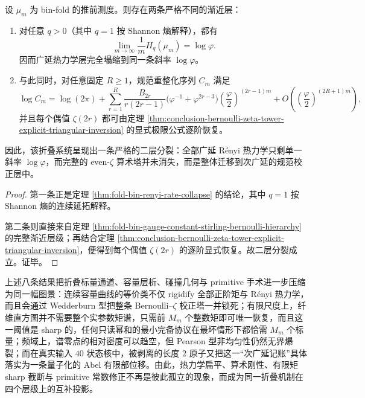 \begin{theorem}[热力学扁平之下的算术刚性]\label{thm:conclusion-thermodynamic-flattening-subextensive-arithmetic-rigidity}
设 \(\mu_m\) 为 bin-fold 的推前测度。则存在两条严格不同的渐近层：
\begin{enumerate}
  \item 对任意 \(q>0\)（其中 \(q=1\) 按 Shannon 熵解释），都有
  \[
  \lim_{m\to\infty}\frac{1}{m}H_q(\mu_m)=\log\varphi.
  \]
  因而广延热力学层完全塌缩到同一条斜率 \(\log\varphi\)。
  \item 与此同时，对任意固定 \(R\ge 1\)，规范重整化序列 \(C_m\) 满足
  \[
  \log C_m
  =
  \log(2\pi)
  +
  \sum_{r=1}^{R}
  \frac{B_{2r}}{r(2r-1)}
  \bigl(\varphi^{-1}+\varphi^{2r-3}\bigr)
  \left(\frac{\varphi}{2}\right)^{(2r-1)m}
  +
  O\!\left(\left(\frac{\varphi}{2}\right)^{(2R+1)m}\right),
  \]
  并且每个偶值 \(\zeta(2r)\) 都可由定理 \ref{thm:conclusion-bernoulli-zeta-tower-explicit-triangular-inversion} 的显式极限公式逐阶恢复。
\end{enumerate}
因此，该折叠系统呈现出一条严格的二层分裂：全部广延 Rényi 热力学只剩单一斜率 \(\log\varphi\)，而完整的 even-\(\zeta\) 算术塔并未消失，而是整体迁移到次广延的规范校正层中。
\end{theorem}
\begin{proof}
第一条正是定理 \ref{thm:fold-bin-renyi-rate-collapse} 的结论，其中 \(q=1\) 按 Shannon 熵的连续延拓解释。

第二条则直接来自定理 \ref{thm:fold-bin-gauge-constant-stirling-bernoulli-hierarchy} 的完整渐近层级；再结合定理 \ref{thm:conclusion-bernoulli-zeta-tower-explicit-triangular-inversion}，便得到每个偶值 \(\zeta(2r)\) 的逐阶显式恢复。故二层分裂成立。证毕。
\end{proof}

\noindent
上述八条结果把折叠标量通道、容量层析、碰撞几何与 primitive 手术进一步压缩为同一幅图景：连续容量曲线的等价类不仅 rigidify 全部正阶矩与 Rényi 热力学，而且会通过 Wedderburn 型把整条 Bernoulli--\(\zeta\) 校正塔一并锁死；有限尺度上，纤维直方图并不需要整个实参数矩谱，只需前 \(M_m\) 个整数矩即可唯一恢复，而且这一阈值是 sharp 的，任何只读幂和的最小完备协议在最坏情形下都恰需 \(M_m\) 个标量；频域上，谱零点的相对密度可以趋空，但 Pearson 型非均匀性仍然无界爆裂；而在真实输入 \(40\) 状态核中，被剥离的长度 \(2\) 原子又把这一“次广延记账”具体落实为一条量子化的 Abel 有限部位移。由此，热力学扁平、算术刚性、有限矩 sharp 截断与 primitive 常数修正不再是彼此孤立的现象，而成为同一折叠机制在四个层级上的互补投影。

\endinput
